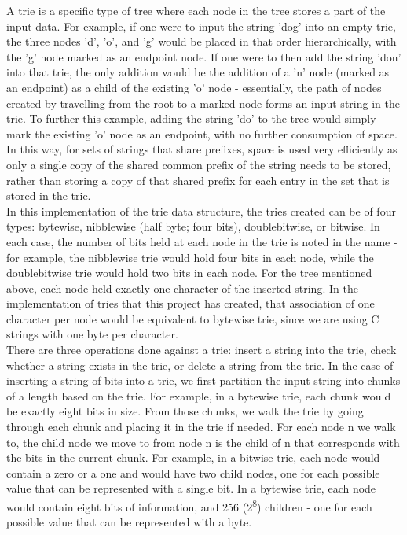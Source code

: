 \documentclass{llncs}
\begin{document}
A trie is a specific type of tree where each node in the tree stores a part of the input data. For example, if one were to input the string 'dog' into an empty trie, the three nodes 'd', 'o', and 'g' would be placed in that order hierarchically, with the 'g' node marked as an endpoint node. If one were to then add the string 'don' into that trie, the only addition would be the addition of a 'n' node (marked as an endpoint) as a child of the existing 'o' node - essentially, the path of nodes created by travelling from the root to a marked node forms an input string in the trie. To further this example, adding the string 'do' to the tree would simply mark the existing 'o' node as an endpoint, with no further consumption of space. In this way, for sets of strings that share prefixes, space is used very efficiently as only a single copy of the shared common prefix of the string needs to be stored, rather than storing a copy of that shared prefix for each entry in the set that is stored in the trie. \\ 
In this implementation of the trie data structure, the tries created can be of four types: bytewise, nibblewise (half byte; four bits), doublebitwise, or bitwise. In each case, the number of bits held at each node in the trie is noted in the name - for example, the nibblewise trie would hold four bits in each node, while the doublebitwise trie would hold two bits in each node. For the tree mentioned above, each node held exactly one character of the inserted string. In the implementation of tries that this project has created, that association of one character per node would be equivalent to bytewise trie, since we are using C strings with one byte per character. \\
There are three operations done against a trie: insert a string into the trie, check whether a string exists in the trie, or delete a string from the trie. In the case of inserting a string of bits into a trie, we first partition the input string into chunks of a length based on the trie. For example, in a bytewise trie, each chunk would be exactly eight bits in size. From those chunks, we walk the trie by going through each chunk and placing it in the trie if needed. For each node n we walk to, the child node we move to from node n is the child of n that corresponds with the bits in the current chunk. For example, in a bitwise trie, each node would contain a zero or a one and would have two child nodes, one for each possible value that can be represented with a single bit. In a bytewise trie, each node would contain eight bits of information, and 256 (2\textsuperscript{8}) children - one for each possible value that can be represented with a byte. \\
\end{document}
